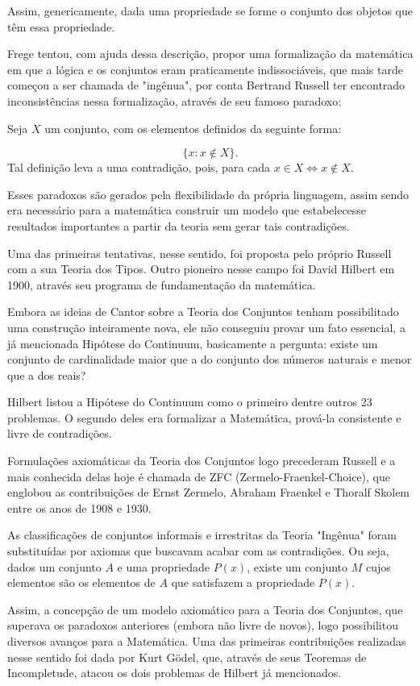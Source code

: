 \documentclass[a4paper,10pt]{article}
\begin{document}
Assim, genericamente, dada uma propriedade se forme o conjunto dos objetos que têm essa propriedade. \cite{conjconj}

Frege tentou, com ajuda dessa descrição, propor uma formalização da matemática em que a lógica e os conjuntos eram praticamente indissociáveis, que mais tarde começou a ser chamada de "ingênua", por conta Bertrand Russell ter encontrado inconsistências nessa formalização, através de seu famoso paradoxo:

Seja $X$ um conjunto, com os elementos definidos da seguinte forma:

$$\{{x : x \notin X}\}.$$ Tal definição leva a uma contradição, pois, para cada $x \in X \Leftrightarrow  x \notin X$.

Esses  paradoxos são  gerados  pela  flexibilidade  da própria  linguagem, assim sendo era necessário para a matemática construir um modelo que estabelecesse resultados importantes a partir da teoria sem gerar tais contradições.\cite{histinfinito}

Uma das primeiras tentativas, nesse sentido, foi proposta pelo próprio Russell com a sua Teoria dos Tipos. Outro pioneiro nesse campo foi David Hilbert em 1900, através seu programa de fundamentação da matemática.

Embora as ideias de Cantor sobre a Teoria dos Conjuntos tenham possibilitado uma construção inteiramente nova, ele não conseguiu provar um fato essencial, a já mencionada Hipótese do Continuum, basicamente a pergunta: existe um conjunto de cardinalidade maior que a do conjunto dos números naturais e menor que a dos reais?
 
Hilbert listou a Hipótese do Continuum como o primeiro dentre outros 23 problemas. O segundo deles era formalizar a Matemática, prová-la consistente e livre de contradições.

Formulações axiomáticas da Teoria dos Conjuntos logo precederam Russell e a mais conhecida delas hoje é chamada de ZFC (Zermelo-Fraenkel-Choice), que englobou as contribuições de Ernst Zermelo, Abraham Fraenkel e Thoralf Skolem entre os anos de 1908 e 1930.\cite{zfc}

As classificações de conjuntos informais e irrestritas da Teoria "Ingênua" foram substituídas por axiomas que buscavam acabar com as contradições. Ou seja, dados um conjunto $A$ e uma propriedade $P(x)$, existe um conjunto $M$ cujos elementos são os elementos de $A$ que satisfazem a propriedade $P(x)$.\cite{intro_tese}

Assim, a concepção de um modelo axiomático para a Teoria dos Conjuntos, que superava os paradoxos anteriores (embora não livre de novos), logo possibilitou diversos avanços para a Matemática. Uma das primeiras contribuições realizadas nesse sentido foi dada por Kurt Gödel, que, através de seus Teoremas de Incompletude, atacou os dois problemas de Hilbert já mencionados.
\end{document}
